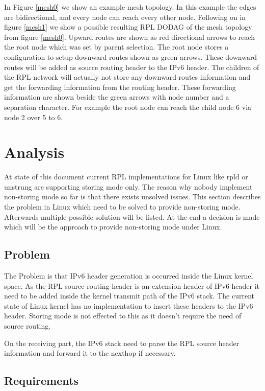 \documentclass[letterpaper]{article}
\begin{document}
In Figure \ref{mesh0} we show an example mesh topology. In this example the
edges are bidirectional, and every node can reach every other node. Following on
in figure \ref{mesh1} we show a possible resulting RPL DODAG of the mesh topology from figure \ref{mesh0}.
Upward routes are shown as red directional arrows to reach the root node which was set by parent selection.
The root node stores a configuration to setup downward routes shown as green arrows.
These downward routes will be added as source routing header to the IPv6 header.
The children of the RPL network will actually not store any downward routes information and get the forwarding information from the routing header.
These forwarding information are shown beside the green arrows with node number and a separation character.
For example the root node can reach the child node 6 via node 2 over 5 to 6.

\section{Analysis}

At state of this document current RPL implementations for Linux like rpld or unstrung \cite{unstrung} are supporting storing mode only.
The reason why nobody implement non-storing mode so far is that there exists unsolved issues.
This section describes the problem in Linux which need to be solved to provide non-storing mode.
Afterwards multiple possible solution will be listed.
At the end a decision is made which will be the approach to provide non-storing mode under Linux.

\subsection{Problem}

The Problem is that IPv6 header generation is occurred inside the Linux kernel space.
As the RPL source routing header is an extension header of IPv6 header it need to be added inside the kernel transmit path of the IPv6 stack.
The current state of Linux kernel has no implementation to insert these headers to the IPv6 header.
Storing mode is not effected to this as it doesn't require the need of source routing.

On the receiving part, the IPv6 stack need to parse the RPL source header information and forward it to the nexthop if necessary.

\subsection{Requirements}
\end{document}
